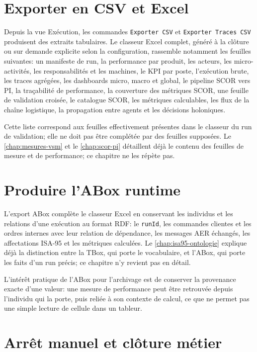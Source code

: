 \section{Exporter en CSV et Excel}

Depuis la vue Exécution, les commandes \texttt{Exporter CSV} et \texttt{Exporter Traces CSV} produisent des extraits tabulaires. Le classeur Excel complet, généré à la clôture ou sur demande explicite selon la configuration, rassemble notamment les feuilles suivantes: un manifeste de run, la performance par produit, les acteurs, les micro-activités, les responsabilités et les machines, le KPI par poste, l'exécution brute, les traces agrégées, les dashboards micro, macro et global, le pipeline SCOR vers PI, la traçabilité de performance, la couverture des métriques SCOR, une feuille de validation croisée, le catalogue SCOR, les métriques calculables, les flux de la chaîne logistique, la propagation entre agents et les décisions holoniques.

Cette liste correspond aux feuilles effectivement présentes dans le classeur du run de validation; elle ne doit pas être complétée par des feuilles supposées. Le \cref{chap:mesures-vsm} et le \cref{chap:scor-pi} détaillent déjà le contenu des feuilles de mesure et de performance; ce chapitre ne les répète pas.

\section{Produire l'ABox runtime}

L'export ABox complète le classeur Excel en conservant les individus et les relations d'une exécution au format RDF: le \texttt{runId}, les commandes clientes et les ordres internes avec leur relation de dépendance, les messages AER échangés, les affectations ISA-95 et les métriques calculées. Le \cref{chap:isa95-ontologie} explique déjà la distinction entre la TBox, qui porte le vocabulaire, et l'ABox, qui porte les faits d'un run précis; ce chapitre n'y revient pas en détail.

L'intérêt pratique de l'ABox pour l'archivage est de conserver la provenance exacte d'une valeur: une mesure de performance peut être retrouvée depuis l'individu qui la porte, puis reliée à son contexte de calcul, ce que ne permet pas une simple lecture de cellule dans un tableur.

\section{Arrêt manuel et clôture métier}

